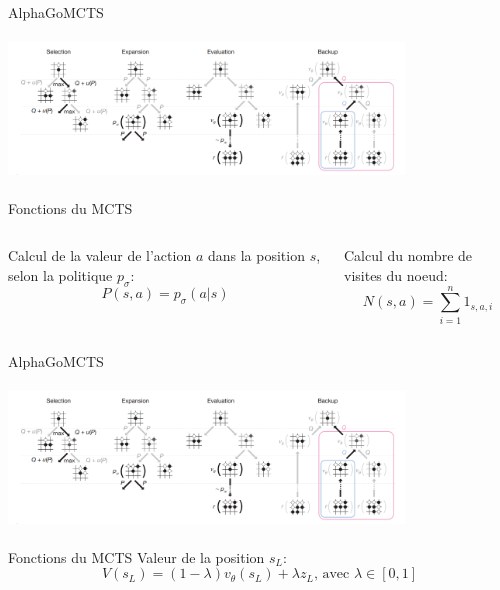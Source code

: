 \begin{frame}{AlphaGo}{MCTS}
    \begin{center}
        \includegraphics[width=10.5cm, height=3.8cm]{ressources/AlphaGo/MCTS_AlphaGo}
        \begin{block}{ Fonctions du MCTS }
            \begin{columns}[t]
                \begin{column}{0.45\textwidth}
                    Calcul de la valeur de l'action $a$ dans la position $s$, selon la politique $p_\sigma$:
                    $$P(s,a) = p_\sigma(a|s)$$

                \end{column}
                \begin{column}{0.45\textwidth}
                    Calcul du nombre de visites du noeud:
                    $$N (s,a) = \sum\limits_{i=1}^{n} 1_{s,a,i} $$
                \end{column}

            \end{columns}
        \end{block}

    \end{center}
\end{frame}

\begin{frame}{AlphaGo}{MCTS}
    \begin{center}
        \includegraphics[width=10.5cm, height=3.8cm]{ressources/AlphaGo/MCTS_AlphaGo}
        \begin{block}{ Fonctions du MCTS }
            Valeur de la position $s_L$:
            $$V(s_L)=(1-\lambda)v_\theta(s_L) + \lambda z_L \mbox{, avec } \lambda \in [0,1]$$
        \end{block}
    \end{center}
\end{frame}

